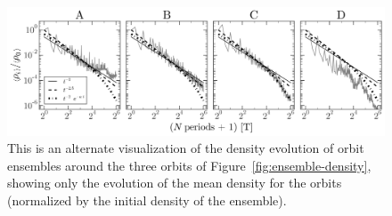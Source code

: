 \documentclass[letterpaper,12pt,preprint]{aastex}
\begin{document}
\clearpage
\begin{figure}[p]
\begin{center}
\includegraphics[width=\textwidth]{figures/ensemble-densities.png}
\caption{This is an alternate visualization of the density evolution of orbit ensembles around the three orbits of Figure~\ref{fig:ensemble-density}, showing only the evolution of the mean density for the orbits (normalized by the initial density of the ensemble).} 
\label{fig:densities}
\end{center}
\end{figure}
\end{document}
